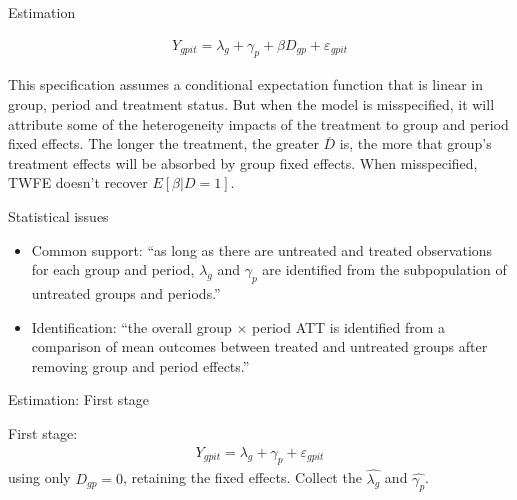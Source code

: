 \documentclass{beamer}
\begin{document}
\begin{frame}{Estimation}

\begin{eqnarray*}
Y_{gpit} = \lambda_g + \gamma_p + \beta D_{gp} + \varepsilon_{gpit}
\end{eqnarray*}

\bigskip

This specification assumes a conditional expectation function that is linear in group, period and treatment status.  But when the model is misspecified, it will attribute some of the heterogeneity impacts of the treatment to group and period fixed effects.  The longer the treatment, the greater $\overline{D}$ is, the more that group's treatment effects will be absorbed by group fixed effects.  When misspecified, TWFE doesn't recover $E[\beta | D=1]$.

\end{frame}

\begin{frame}{Statistical issues}

\begin{itemize}
\item Common support: ``as long as there are untreated and treated observations for each group and period, $\lambda_g$ and $\gamma_p$ are identified from the subpopulation of untreated groups and periods.''
\item Identification: ``the overall group $\times$ period ATT is identified from a comparison of mean outcomes between treated and untreated groups after removing group and period effects.''
\end{itemize}

\end{frame}


\begin{frame}{Estimation: First stage}


First stage:
\begin{eqnarray*}
Y_{gpit} = \lambda_g + \gamma_p + \varepsilon_{gpit}
\end{eqnarray*}using only $D_{gp}=0$, retaining the fixed effects. Collect the $\widehat{\lambda_g}$ and $\widehat{\gamma_p}$.

\end{frame}
\end{document}
